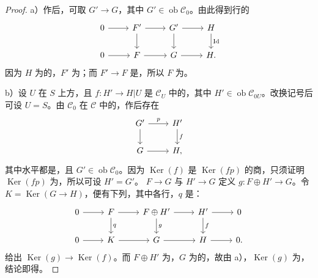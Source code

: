 \begin{proof}
a）作后，可取 $G'\to G$，其中 $G'\in\operatorname{ob}\mathcal C_0$。由此得到行的
\[\begin{tikzcd}
0\arrow[r]&F'\arrow[r]\arrow[d]&G'\arrow[r]\arrow[d]&H\arrow[d,"\mathrm{Id}"]\\
0\arrow[r]&F\arrow[r]&G\arrow[r]&H.
\end{tikzcd}\]
因为 $H$ 为的，$F'$ 为；而 $F'\to F$ 是，所以 $F$ 为。

b）设 $U$ 在 $S$ 上方，且 $f:H'\to H|U$ 是 $\mathcal C_U$ 中的，其中 $H'\in\operatorname{ob}\mathcal C_{0U}$。改换记号后可设 $U=S$。由 $\mathcal C_0$ 在 $\mathcal C$ 中的，作后存在
\[\begin{tikzcd}G'\arrow[r,"p"]\arrow[d]&H'\arrow[d,"f"]\\G\arrow[r]&H,\end{tikzcd}\]
其中水平都是，且 $G'\in\operatorname{ob}\mathcal C_0$。因为 $\operatorname{Ker}(f)$ 是 $\operatorname{Ker}(fp)$ 的商，只须证明 $\operatorname{Ker}(fp)$ 为，所以可设 $H'=G'$。 $F\to G$ 与 $H'\to G$ 定义 $g:F\oplus H'\to G$。令 $K=\operatorname{Ker}(G\to H)$，便有下列，其中各行，$q$ 是：
\[\begin{tikzcd}
0\arrow[r]&F\arrow[r]\arrow[d,"q"]&F\oplus H'\arrow[r]\arrow[d,"g"]&H'\arrow[r]\arrow[d,"f"]&0\\
0\arrow[r]&K\arrow[r]&G\arrow[r]&H\arrow[r]&0.
\end{tikzcd}\]
给出 $\operatorname{Ker}(g)\to\operatorname{Ker}(f)$。而 $F\oplus H'$ 为，$G$ 为的，故由 a），$\operatorname{Ker}(g)$ 为，结论即得。


\end{proof}
